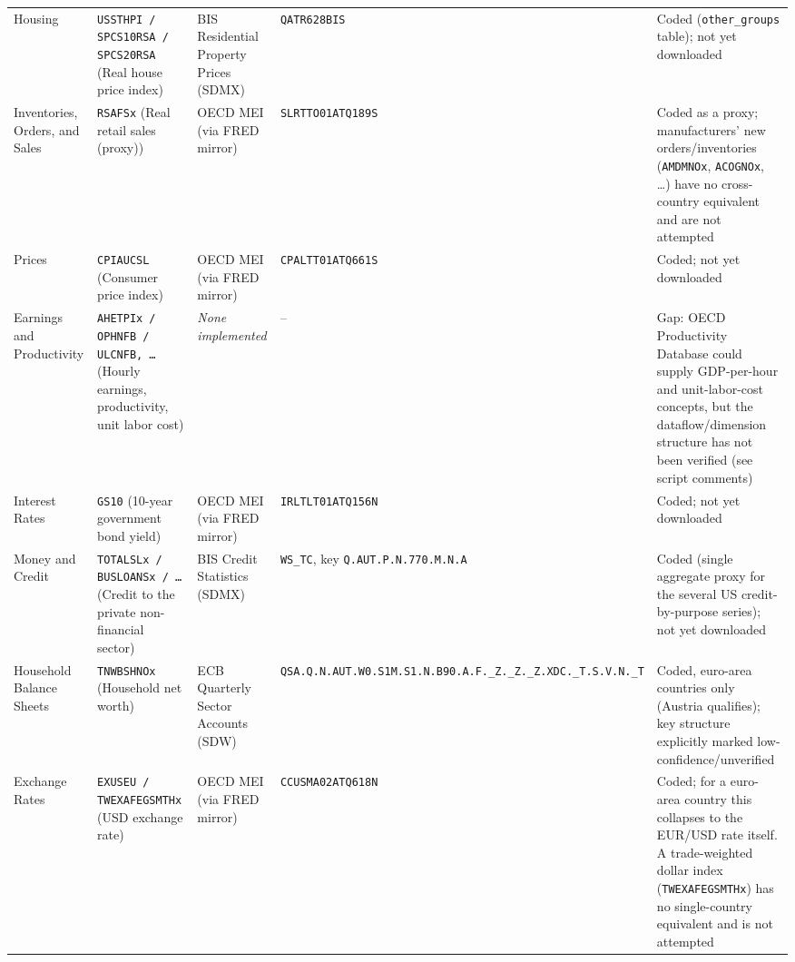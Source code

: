 \documentclass[11pt]{article}
\begin{document}
\begin{landscape}
\begin{longtable}{L{3cm} L{4.3cm} L{3.2cm} L{3.8cm} L{6.2cm}}
Housing & \texttt{USSTHPI / SPCS10RSA / SPCS20RSA} (Real house price index) & BIS Residential Property Prices (SDMX) & \texttt{QATR628BIS} & Coded (\texttt{other\_\allowbreak{}groups} table); not yet downloaded \\
Inventories, Orders, and Sales & \texttt{RSAFSx} (Real retail sales (proxy)) & OECD MEI (via FRED mirror) & \texttt{SLRTTO01ATQ189S} & Coded as a proxy; manufacturers' new orders/\allowbreak{}inventories (\texttt{AMDMNOx}, \texttt{ACOGNOx}, \ldots) have no cross-country equivalent and are not attempted \\
Prices & \texttt{CPIAUCSL} (Consumer price index) & OECD MEI (via FRED mirror) & \texttt{CPALTT01ATQ661S} & Coded; not yet downloaded \\
Earnings and Productivity & \texttt{AHETPIx / OPHNFB / ULCNFB, \ldots} (Hourly earnings, productivity, unit labor cost) & \emph{None implemented} & -- & Gap: OECD Productivity Database could supply GDP-per-hour and unit-labor-cost concepts, but the dataflow/\allowbreak{}dimension structure has not been verified (see script comments) \\
Interest Rates & \texttt{GS10} (10-year government bond yield) & OECD MEI (via FRED mirror) & \texttt{IRLTLT01ATQ156N} & Coded; not yet downloaded \\
Money and Credit & \texttt{TOTALSLx / BUSLOANSx / \ldots} (Credit to the private non-financial sector) & BIS Credit Statistics (SDMX) & \texttt{WS\_\allowbreak{}TC}, key \texttt{Q.\allowbreak{}AUT.\allowbreak{}P.\allowbreak{}N.\allowbreak{}770.\allowbreak{}M.\allowbreak{}N.\allowbreak{}A} & Coded (single aggregate proxy for the several US credit-by-purpose series); not yet downloaded \\
Household Balance Sheets & \texttt{TNWBSHNOx} (Household net worth) & ECB Quarterly Sector Accounts (SDW) & \texttt{QSA.\allowbreak{}Q.\allowbreak{}N.\allowbreak{}AUT.\allowbreak{}W0.\allowbreak{}S1M.\allowbreak{}S1.\allowbreak{}N.\allowbreak{}B90.\allowbreak{}A.\allowbreak{}F.\allowbreak{}\_\allowbreak{}Z.\allowbreak{}\_\allowbreak{}Z.\allowbreak{}\_\allowbreak{}Z.\allowbreak{}XDC.\allowbreak{}\_\allowbreak{}T.\allowbreak{}S.\allowbreak{}V.\allowbreak{}N.\allowbreak{}\_\allowbreak{}T} & Coded, euro-area countries only (Austria qualifies); key structure explicitly marked low-confidence/\allowbreak{}unverified \\
Exchange Rates & \texttt{EXUSEU / TWEXAFEGSMTHx} (USD exchange rate) & OECD MEI (via FRED mirror) & \texttt{CCUSMA02ATQ618N} & Coded; for a euro-area country this collapses to the EUR/\allowbreak{}USD rate itself.\allowbreak{} A trade-weighted dollar index (\texttt{TWEXAFEGSMTHx}) has no single-country equivalent and is not attempted \\

\end{longtable}
\end{landscape}
\end{document}
